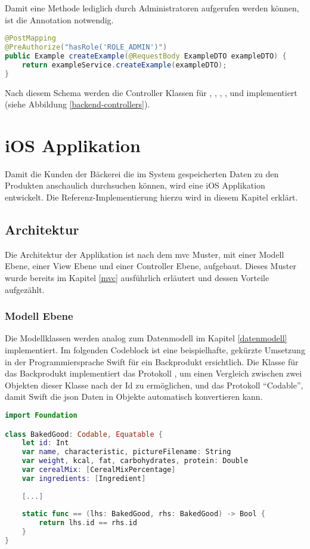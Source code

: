 Damit eine Methode lediglich durch Administratoren aufgerufen werden können, ist die Annotation  notwendig.
\begin{lstlisting}[language=Java]
@PostMapping
@PreAuthorize("hasRole('ROLE_ADMIN')")
public Example createExample(@RequestBody ExampleDTO exampleDTO) {
	return exampleService.createExample(exampleDTO);
}
\end{lstlisting}

Nach diesem Schema werden die Controller Klassen für , , , ,  und  implementiert (siehe Abbildung \ref{backend-controllers}). 

\clearpage


\clearpage

\section{iOS Applikation}
Damit die Kunden der Bäckerei die im System gespeicherten Daten zu den Produkten anschaulich durchsuchen können, wird eine iOS Applikation entwickelt.
Die Referenz-Implementierung hierzu wird in diesem Kapitel erklärt.

\subsection{Architektur}
Die Architektur der Applikation ist nach dem \gls{mvc} Muster, mit einer Modell Ebene, einer View Ebene und einer Controller Ebene, aufgebaut. Dieses Muster wurde bereits im Kapitel \ref{mvc} ausführlich erläutert und dessen Vorteile aufgezählt.

\subsubsection{Modell Ebene}
Die Modellklassen werden analog zum Datenmodell im Kapitel \ref{datenmodell} implementiert.
Im folgenden Codeblock ist eine beispielhafte, gekürzte Umsetzung in der Programmiersprache Swift für ein Backprodukt ersichtlich.
Die Klasse für das Backprodukt implementiert das Protokoll , um einen Vergleich zwischen zwei Objekten dieser Klasse nach der Id zu ermöglichen, und das Protokoll  \enquote{Codable}, damit Swift die \gls{json} Daten in Objekte automatisch konvertieren kann.
\begin{lstlisting}[language=Swift]
import Foundation

class BakedGood: Codable, Equatable {
    let id: Int
    var name, characteristic, pictureFilename: String
    var weight, kcal, fat, carbohydrates, protein: Double
    var cerealMix: [CerealMixPercentage]
    var ingredients: [Ingredient]
    
    [...]
    
    static func == (lhs: BakedGood, rhs: BakedGood) -> Bool {
        return lhs.id == rhs.id
    }
}
\end{lstlisting}

